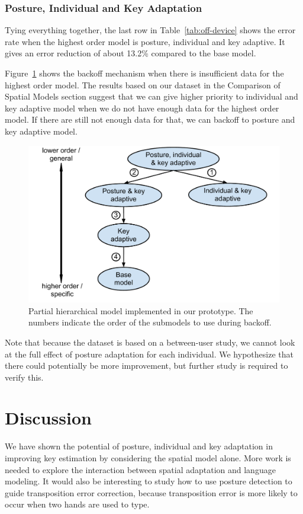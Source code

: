 \documentclass{sigchi}
\begin{document}
\subsubsection{Posture, Individual and Key Adaptation}
Tying everything together, the last row in Table~\ref{tab:off-device} shows the error rate when the highest order model is posture, individual and key adaptive. It gives an error reduction of about 13.2\% compared to the base model.

Figure~\ref{fig:partial-hierarchy} shows the backoff mechanism when there is insufficient data for the highest order model. The results based on our dataset in the Comparison of Spatial Models section suggest that we
can give higher priority to individual and key adaptive model when we do not have enough data for
the highest order model. If there are still not enough data for that, we 
can backoff to posture and key adaptive model. 

\begin{figure}
  \centering
  \includegraphics[width=0.9\columnwidth]{figures/partial-hierarchy.pdf}
  \caption{Partial hierarchical model implemented in our prototype. The numbers indicate the order of the 
submodels to use during backoff.}
  \label{fig:partial-hierarchy}
\end{figure}
Note that because the dataset is based on a between-user study, we cannot look
at the full effect of posture adaptation for each individual. We hypothesize that there could potentially be more improvement, but further study is required to verify this.

\section{Discussion}
We have shown the potential of posture, individual and key adaptation in improving key estimation by considering the spatial model alone. 
More work is needed to explore the interaction between spatial adaptation and
language modeling. It would also be interesting to study how
to use posture detection to guide transposition error correction, because transposition error
is more likely to occur when two hands are used to type.
\end{document}
